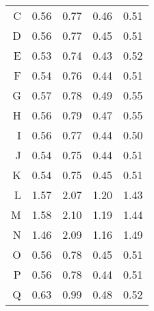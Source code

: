 {{{\begin{table}[htbp]
\begin{tabular}{rrrrr}
            C   &  0.56 & 0.77 & 0.46 & 0.51\\
            D   &  0.56 & 0.77 & 0.45 & 0.51\\
            E   &  0.53 & 0.74 & 0.43 & 0.52\\
            F   &  0.54 & 0.76 & 0.44 & 0.51\\
            G   &  0.57 & 0.78 & 0.49 & 0.55\\
            H   &  0.56 & 0.79 & 0.47 & 0.55\\
            I   &  0.56 & 0.77 & 0.44 & 0.50\\
            J   &  0.54 & 0.75 & 0.44 & 0.51\\
            K   &  0.54 & 0.75 & 0.45 & 0.51\\
            L   &  1.57 & 2.07 & 1.20 & 1.43\\
            M   &  1.58 & 2.10 & 1.19 & 1.44\\
            N   &  1.46 & 2.09 & 1.16 & 1.49\\
            O   &  0.56 & 0.78 & 0.45 & 0.51\\
            P   &  0.56 & 0.78 & 0.44 & 0.51\\
            Q   &  0.63 & 0.99 & 0.48 & 0.52\\\bottomrule
        \end{tabular}
      \end{table}

}}}
